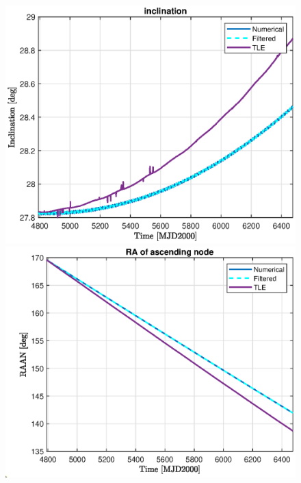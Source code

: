 \begin{figure}[H]
\begin{minipage}{0.48\linewidth}
		\includegraphics[width=\n\linewidth]{i_TLE.eps}
	\end{minipage}\hfill
	\begin{minipage}{0.48\linewidth}
		\centering
		\includegraphics[width=\n\linewidth]{RAAN_TLE.eps}
	\end{minipage}
	\vfill
	\begin{minipage}{0.48\linewidth}
		\centering

\end{minipage}
\end{figure}
